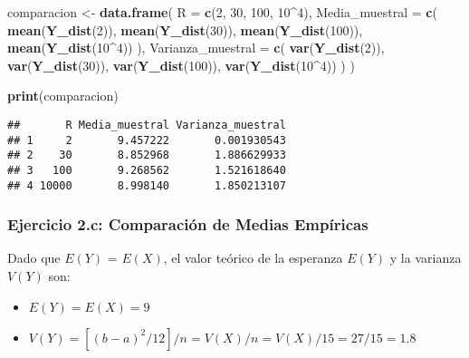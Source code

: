 \documentclass[
]{article}
\newenvironment{Shaded}{\begin{snugshade}}{\end{snugshade}}
\newcommand{\AttributeTok}[1]{\textcolor[rgb]{0.13,0.29,0.53}{#1}}
\newcommand{\DecValTok}[1]{\textcolor[rgb]{0.00,0.00,0.81}{#1}}
\newcommand{\FunctionTok}[1]{\textcolor[rgb]{0.13,0.29,0.53}{\textbf{#1}}}
\newcommand{\NormalTok}[1]{#1}
\newcommand{\OtherTok}[1]{\textcolor[rgb]{0.56,0.35,0.01}{#1}}
\newcommand{\SpecialCharTok}[1]{\textcolor[rgb]{0.81,0.36,0.00}{\textbf{#1}}}
\begin{document}
\begin{Shaded}
\begin{Highlighting}[]
\NormalTok{comparacion }\OtherTok{\textless{}{-}} \FunctionTok{data.frame}\NormalTok{(}
  \AttributeTok{R =} \FunctionTok{c}\NormalTok{(}\DecValTok{2}\NormalTok{, }\DecValTok{30}\NormalTok{, }\DecValTok{100}\NormalTok{, }\DecValTok{10}\SpecialCharTok{\^{}}\DecValTok{4}\NormalTok{), }
    \AttributeTok{Media\_muestral =} \FunctionTok{c}\NormalTok{(}
    \FunctionTok{mean}\NormalTok{(}\FunctionTok{Y\_dist}\NormalTok{(}\DecValTok{2}\NormalTok{)),}
    \FunctionTok{mean}\NormalTok{(}\FunctionTok{Y\_dist}\NormalTok{(}\DecValTok{30}\NormalTok{)),}
    \FunctionTok{mean}\NormalTok{(}\FunctionTok{Y\_dist}\NormalTok{(}\DecValTok{100}\NormalTok{)),}
    \FunctionTok{mean}\NormalTok{(}\FunctionTok{Y\_dist}\NormalTok{(}\DecValTok{10}\SpecialCharTok{\^{}}\DecValTok{4}\NormalTok{))}
\NormalTok{  ),}
  \AttributeTok{Varianza\_muestral =} \FunctionTok{c}\NormalTok{(}
    \FunctionTok{var}\NormalTok{(}\FunctionTok{Y\_dist}\NormalTok{(}\DecValTok{2}\NormalTok{)),}
    \FunctionTok{var}\NormalTok{(}\FunctionTok{Y\_dist}\NormalTok{(}\DecValTok{30}\NormalTok{)),}
    \FunctionTok{var}\NormalTok{(}\FunctionTok{Y\_dist}\NormalTok{(}\DecValTok{100}\NormalTok{)),}
    \FunctionTok{var}\NormalTok{(}\FunctionTok{Y\_dist}\NormalTok{(}\DecValTok{10}\SpecialCharTok{\^{}}\DecValTok{4}\NormalTok{))}
\NormalTok{  )}
\NormalTok{)}

\FunctionTok{print}\NormalTok{(comparacion)}
\end{Highlighting}
\end{Shaded}

\begin{verbatim}
##       R Media_muestral Varianza_muestral
## 1     2       9.457222       0.001930543
## 2    30       8.852968       1.886629933
## 3   100       9.268562       1.521618640
## 4 10000       8.998140       1.850213107
\end{verbatim}

\subsubsection{Ejercicio 2.c: Comparación de Medias
Empíricas}\label{ejercicio-2.c-comparaciuxf3n-de-medias-empuxedricas}

Dado que \(E(Y)\) = \(E(X)\), el valor teórico de la esperanza \(E(Y)\)
y la varianza \(V(Y)\) son:

\begin{itemize}
\item
  \(E(Y) = E(X) = 9\)
\item
  \(V(Y) = [(b - a)^2 / 12] / n = V(X)/n = V(X)/15 = 27/15 = 1.8\)
\end{itemize}
\end{document}
